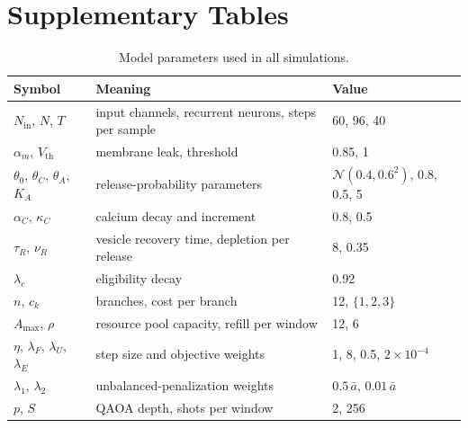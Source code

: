 \documentclass[11pt,a4paper]{article}
\begin{document}
\section*{Supplementary Tables}
\begin{table}[h]
\caption{Model parameters used in all simulations.}
\small
\begin{tabular}{lll}
\toprule
Symbol & Meaning & Value \\
\midrule
$N_{\mathrm{in}}$, $N$, $T$ & input channels, recurrent neurons, steps per sample & 60, 96, 40 \\
$\alpha_m$, $V_{\mathrm{th}}$ & membrane leak, threshold & 0.85, 1 \\
$\theta_0$, $\theta_C$, $\theta_A$, $K_A$ & release-probability parameters & $\mathcal N(0.4,0.6^2)$, 0.8, 0.5, 5 \\
$\alpha_C$, $\kappa_C$ & calcium decay and increment & 0.8, 0.5 \\
$\tau_R$, $\nu_R$ & vesicle recovery time, depletion per release & 8, 0.35 \\
$\lambda_e$ & eligibility decay & 0.92 \\
$n$, $c_k$ & branches, cost per branch & 12, $\{1,2,3\}$ \\
$A_{\max}$, $\rho$ & resource pool capacity, refill per window & 12, 6 \\
$\eta$, $\lambda_F$, $\lambda_U$, $\lambda_E$ & step size and objective weights & 1, 8, 0.5, $2\times10^{-4}$ \\
$\lambda_1$, $\lambda_2$ & unbalanced-penalization weights & $0.5\,\bar a$, $0.01\,\bar a$ \\
$p$, $S$ & QAOA depth, shots per window & 2, 256 \\
\bottomrule
\end{tabular}
\end{table}
\end{document}
